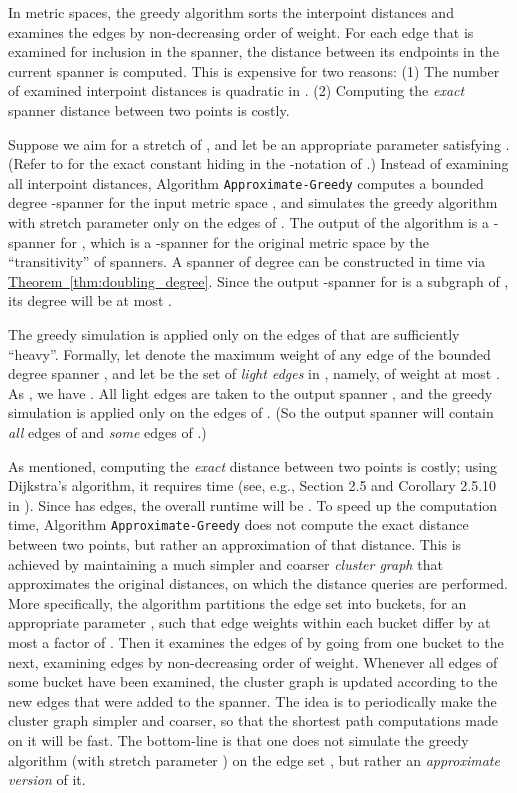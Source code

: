 \documentclass[11pt,letterpaper]{article}
\newcommand{\namedref}[2]{\hyperref[#2]{#1~\ref*{#2}}}
\newcommand{\theoremref}[1]{\namedref{Theorem}{#1}}
\begin{document}
In metric spaces, the greedy algorithm sorts the  interpoint distances and examines the edges by non-decreasing order of weight.
For each edge that is examined for inclusion in the spanner, the distance between its endpoints in the current spanner is computed.
This is expensive for two reasons: (1) The number of examined interpoint distances is quadratic in .
(2) Computing the \emph{exact} spanner distance between two points is   costly.

Suppose we aim for a stretch of , and let  be an appropriate parameter satisfying .
(Refer to \cite{GLN02,NS07} for the exact constant hiding in the -notation of .)
Instead of examining all  interpoint distances, Algorithm \texttt{Approximate-Greedy} computes a
bounded degree -spanner  for the input metric space ,
and simulates the greedy algorithm with stretch parameter  only on the edges of .
The output of the algorithm is a -spanner  for ,
which is a -spanner for the original metric space  by the ``transitivity'' of spanners.
A spanner  of degree  can be constructed in  time via \theoremref{thm:doubling_degree}.
Since the output -spanner  for  is a subgraph of , its degree will be at most .

The greedy simulation is applied only on the edges of  that are sufficiently ``heavy''.
Formally, let  denote the maximum weight of any edge of the bounded degree spanner , and let  be the set of \emph{light edges} in , namely, of weight at most .
As , we have .
All light edges are taken to the output spanner , and the greedy simulation is applied only on the edges of .
(So the output spanner  will contain \emph{all} edges of  and \emph{some} edges of .)

As mentioned, computing the \emph{exact} distance between two points is costly;
using Dijkstra's algorithm, it requires  time (see, e.g., Section 2.5 and Corollary 2.5.10 in \cite{NS07}).
Since  has  edges, the overall runtime will be .
To speed up the computation time, Algorithm \texttt{Approximate-Greedy} does not compute the exact distance between two points, but rather an approximation of that distance.
This is achieved by maintaining a much simpler and coarser \emph{cluster graph} that approximates the original distances, on which the distance queries are performed.
More specifically, the algorithm partitions the edge set  into  buckets,  for an appropriate parameter ,
such that edge weights within each bucket differ by at most a factor of .
Then it examines the edges of  by going from one bucket to the next, examining edges by non-decreasing order of weight.
Whenever all edges of some bucket have been examined, the cluster graph is updated according to the new edges that were added to the spanner.
The idea is to periodically make the cluster graph simpler and coarser, so that the shortest path computations made on it will be fast.
The bottom-line is that one does not simulate the greedy algorithm (with stretch parameter ) on the edge set , but rather an \emph{approximate version} of it.
\end{document}
